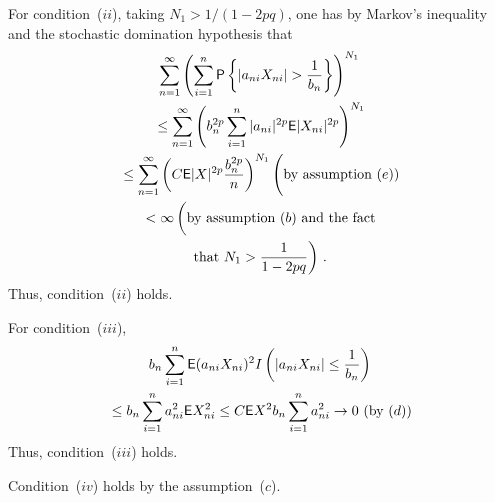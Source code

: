 \begin{multicols}{2}
For condition~($ii$), taking $N_1>1/(1-2pq)$, one has by Markov's inequality and the stochastic domination
hypothesis that
\begin{multline*}
\sum\limits_{n=1}^\infty \left(\sum\limits_{i=1}^n {\sf P}\left\{|a_{ni}X_{ni}|>\fr{1}{b_n}\right\} \right)^{N_1}\\
{}\le \sum\limits_{n=1}^\infty \left( b_n^{2p} \sum\limits_{i=1}^n |a_{ni}|^{2p} 
{\sf E}|X_{ni}|^{2p} \right)^{N_1} \\
{}\le \sum\limits_{n=1}^\infty \left(C {\sf E}|X|^{2p} \fr{b_n^{2p}}{n} \right)^{N_1} 
\Bigg( \mbox{by assumption~($e$))} \\
{}< \infty \left(
\vphantom{\fr{1}{pq}}\mbox{by assumption~($b$) and the fact}\right.\\
\left.\mbox{that } N_1>\fr{1}{1-2pq}\right)\,.
\end{multline*}
Thus, condition~($ii$) holds.

For condition~($iii$),
\begin{multline*}
 b_n \sum\limits_{i=1}^n {\sf E}(a_{ni}X_{ni})^2I\left(\left|a_{ni}X_{ni}\right|\le \displaystyle\frac{\displaystyle 1\mathstrut}{\displaystyle b_n\mathstrut}\right)\\
{}  \le b_n\sum\limits_{i=1}^n a_{ni}^2 {\sf E} X_{ni}^2 
\le C {\sf E} X^2 b_n \sum\limits_{i=1}^n a_{ni}^2\to 0 \mbox{ (by ($d$))}
\end{multline*}
Thus, condition~($iii$) holds.

Condition~($iv$) holds by the assumption~($c$).


\end{multicols}
